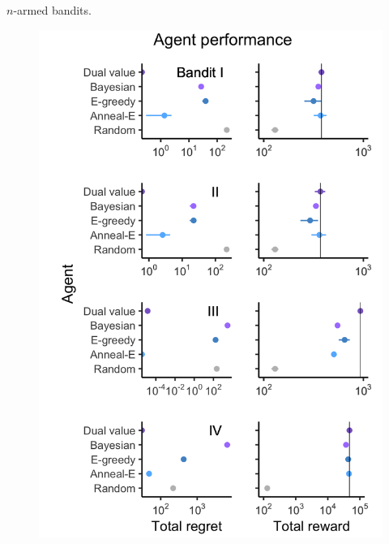 \documentclass[10pt]{beamer}
\begin{document}
\begin{frame}[fragile]{$n$-armed bandits.}
\begin{figure}
    \centering
    \includegraphics[scale=0.125]{images/fig3.png}
    \caption{}
\end{figure}
\end{frame}
\end{document}
